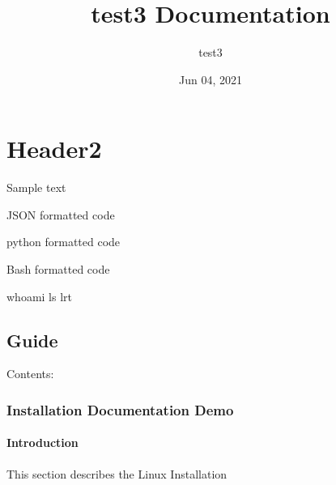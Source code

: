 \documentclass[letterpaper,10pt,english]{sphinxmanual}
\title{test3 Documentation}
\date{Jun 04, 2021}
\author{test3}
\begin{document}
\pagestyle{empty}
\sphinxmaketitle
\pagestyle{plain}
\sphinxtableofcontents
\pagestyle{normal}
\label{\detokenize{index::doc}}



\chapter{Header2}
\label{\detokenize{index:header2}}
\sphinxAtStartPar
Sample text

\sphinxAtStartPar
JSON formatted code

\begin{sphinxVerbatim}[commandchars=\\\{\}]
   
\end{sphinxVerbatim}

\sphinxAtStartPar
python formatted code

\begin{sphinxVerbatim}[commandchars=\\\{\}]
  
\end{sphinxVerbatim}

\sphinxAtStartPar
Bash formatted code

\begin{sphinxVerbatim}[commandchars=\\\{\}]
whoami
ls \PYGZhy{}lrt
\end{sphinxVerbatim}


\section{Guide}
\label{\detokenize{index:guide}}
\sphinxAtStartPar
Contents:


\subsection{Installation Documentation \sphinxhyphen{} Demo}
\label{\detokenize{install:installation-documentation-demo}}\label{\detokenize{install::doc}}

\subsubsection{Introduction}
\label{\detokenize{install:introduction}}
\sphinxAtStartPar
This section describes the Linux Installation
\end{document}
